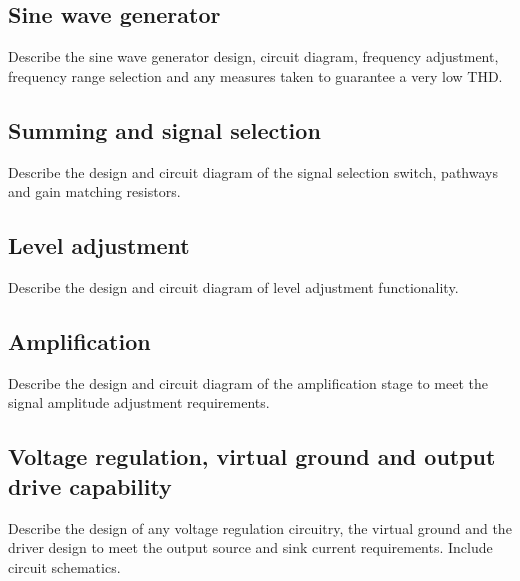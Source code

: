 \documentclass[11pt,a4paper]{article}
\begin{document}
\subsection{Sine wave generator}

Describe the sine wave generator design, circuit diagram, frequency adjustment, frequency range selection and any measures taken to guarantee a very low THD.

\subsection{Summing and signal selection}

Describe the design and circuit diagram of the signal selection switch, pathways and gain matching resistors.

\subsection{Level adjustment}

Describe the design and circuit diagram of level adjustment functionality.

\subsection{Amplification}

Describe the design and circuit diagram of the amplification stage to meet the signal amplitude adjustment requirements.

\subsection{Voltage regulation, virtual ground and output drive capability}

Describe the design of any voltage regulation circuitry, the virtual ground and the driver design to meet the output source and sink current requirements. Include circuit schematics.

\end{document}
